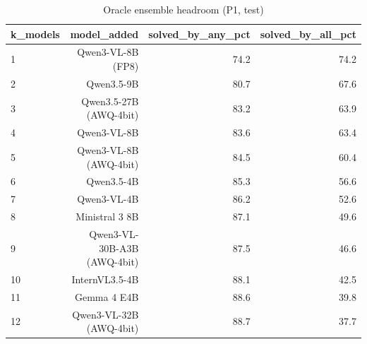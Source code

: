 \begin{table}[t]
\centering
\caption{Oracle ensemble headroom (P1, test)}
\label{tab:headroom}
\small
\begin{tabular}{lrrr}
\toprule
k\_models & model\_added & solved\_by\_any\_pct & solved\_by\_all\_pct \\
\midrule
1 & Qwen3-VL-8B (FP8) & 74.2 & 74.2 \\
2 & Qwen3.5-9B & 80.7 & 67.6 \\
3 & Qwen3.5-27B (AWQ-4bit) & 83.2 & 63.9 \\
4 & Qwen3-VL-8B & 83.6 & 63.4 \\
5 & Qwen3-VL-8B (AWQ-4bit) & 84.5 & 60.4 \\
6 & Qwen3.5-4B & 85.3 & 56.6 \\
7 & Qwen3-VL-4B & 86.2 & 52.6 \\
8 & Ministral 3 8B & 87.1 & 49.6 \\
9 & Qwen3-VL-30B-A3B (AWQ-4bit) & 87.5 & 46.6 \\
10 & InternVL3.5-4B & 88.1 & 42.5 \\
11 & Gemma 4 E4B & 88.6 & 39.8 \\
12 & Qwen3-VL-32B (AWQ-4bit) & 88.7 & 37.7 \\
\bottomrule
\end{tabular}
\par{}
\end{table}
